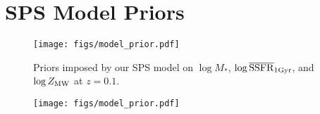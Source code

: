 \section{SPS Model Priors} \label{sec:model_priors}
\begin{figure}
\begin{center}
\texttt{[image: figs/model\_prior.pdf]}
    \caption{
    Priors imposed by our SPS model on $\log M_*$, 
    $\log \overline{\rm SSFR}_{\rm 1 Gyr}$, and $\log Z_{\rm MW}$ at $z=0.1$. 
    }\label{fig:model_prior}
\end{center}
\end{figure}


\begin{figure}
\begin{center}
\texttt{[image: figs/model\_prior.pdf]}
    \caption{
    }\label{fig:sfh_prior}
\end{center}
\end{figure}
